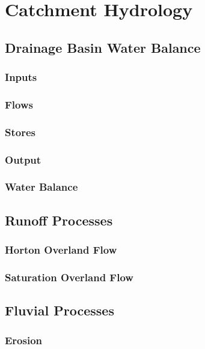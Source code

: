 \documentclass[../../main]{subfiles}
\begin{document}
\section{Catchment Hydrology}

\subsection{Drainage Basin Water Balance}

\subsubsection{Inputs}

\subsubsection{Flows}

\subsubsection{Stores}

\subsubsection{Output}

\subsubsection{Water Balance}

\subsection{Runoff Processes}

\subsubsection{Horton Overland Flow}

\subsubsection{Saturation Overland Flow}

\subsection{Fluvial Processes}

\subsubsection{Erosion}
\end{document}
